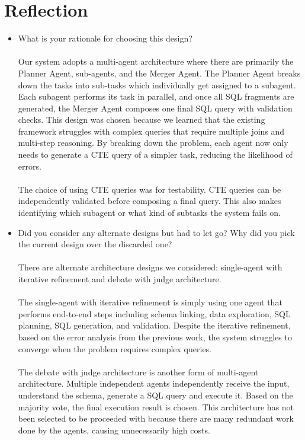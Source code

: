 \section{Reflection}
\begin{itemize}
    \item What is your rationale for choosing this design? \\\\
    Our system adopts a multi-agent architecture where there are primarily the Planner Agent, sub-agents, and the Merger Agent. The Planner Agent breaks down the tasks into sub-tasks which individually get assigned to a subagent. Each subagent performs its task in parallel, and once all SQL fragments are generated, the Merger Agent composes one final SQL query with validation checks. This design was chosen because we learned that the existing framework struggles with complex queries that require multiple joins and multi-step reasoning. By breaking down the problem, each agent now only needs to generate a CTE query of a simpler task, reducing the likelihood of errors.
\\\\
    The choice of using CTE queries was for testability. CTE queries can be independently validated before composing a final query. This also makes identifying which subagent or what kind of subtasks the system fails on.

    \item Did you consider any alternate designs but had to let go? Why did you pick the current design over the discarded one?
\\\\There are alternate architecture designs we considered: single-agent with iterative refinement and debate with judge architecture. 
\\\\
The single-agent with iterative refinement is simply using one agent that performs end-to-end steps including schema linking, data exploration, SQL planning, SQL generation, and validation. Despite the iterative refinement, based on the error analysis from the previous work, the system struggles to converge when the problem requires complex queries.
\\\\
The debate with judge architecture is another form of multi-agent architecture. Multiple independent agents independently receive the input, understand the schema, generate a SQL query and execute it. Based on the majority vote, the final execution result is chosen. This architecture has not been selected to be proceeded with because there are many redundant work done by the agents, causing unnecessarily high costs.


\end{itemize}
